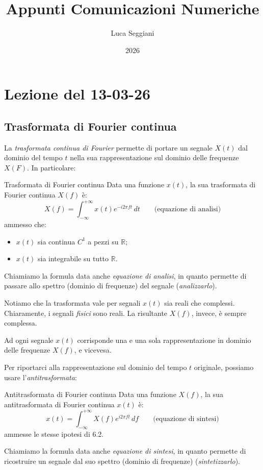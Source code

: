 \documentclass[a4paper,11pt]{article}
\title{Appunti Comunicazioni Numeriche}
\author{Luca Seggiani}
\date{2026}
\begin{document}
\section{Lezione del 13-03-26}

\thispagestyle{empty}
\pagestyle{fancy}

\subsection{Trasformata di Fourier continua}
La \textit{trasformata continua di Fourier} permette di portare un segnale $X(t)$ dal dominio del tempo $t$ nella sua rappresentazione sul dominio delle frequenze $X(F)$. In particolare:
\begin{definition}{Trasformata di Fourier continua}
Data una funzione $x(t)$, la sua trasformata di Fourier continua $X(f)$ è:
$$
X(f) = \int_{-\infty}^{+\infty} x(t) e^{-i 2 \pi f t} \, dt \quad \quad \text{(equazione di analisi)}
$$
ammesso che:
\begin{itemize}
	\item $x(t)$ sia continua $C^1$ a pezzi su $\mathbb{R}$;
	\item $x(t)$ sia integrabile su tutto $\mathbb{R}$.
\end{itemize}
\end{definition}
Chiamiamo la formula data anche \textit{equazione di analisi}, in quanto permette di passare allo spettro (dominio di frequenze) del segnale (\textit{analizzarlo}).

Notiamo che la trasformata vale per segnali $x(t)$ sia reali che complessi. Chiaramente, i segnali \textit{fisici} sono reali. La risultante $X(f)$, invece, è sempre complessa. 

Ad ogni segnale $x(t)$ corrisponde una e una sola rappresentazione in dominio delle frequenze $X(f)$, e vicevesa.

Per riportarci alla rappresentazione sul dominio del tempo $t$ originale, possiamo usare l'\textit{antitrasformata}:
\begin{definition}{Antitrasformata di Fourier continua}
Data una funzione $X(f)$, la sua antitrasformata di Fourier continua $x(t)$ è:
$$
x(t) = \int_{-\infty}^{+\infty} X(f) e^{i 2 \pi f t} \, df \quad \quad \text{(equazione di sintesi)}
$$
ammesse le stesse ipotesi di 6.2.
\end{definition}
Chiamiamo la formula data anche \textit{equazione di sintesi}, in quanto permette di ricostruire un segnale dal suo spettro (dominio di frequenze) (\textit{sintetizzarlo}).
\end{document}
